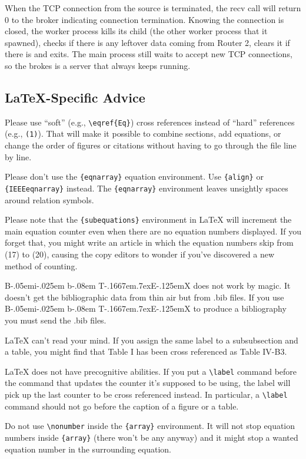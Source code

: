 \documentclass[conference]{IEEEtran}
\def\BibTeX{{\rm B\kern-.05em{\sc i\kern-.025em b}\kern-.08em
    T\kern-.1667em\lower.7ex\hbox{E}\kern-.125emX}}
\begin{document}
When the TCP connection from the source is terminated, the recv call will return 0
to the broker indicating connection termination. Knowing the connection is closed,
the worker process kills its child (the other worker process that it spawned),
checks if there is any leftover data coming from Router 2, clears it if there is
and exits. The main process still waits to accept new TCP connections, so the brokes
is a server that always keeps running.

\subsection{\LaTeX-Specific Advice}

Please use ``soft'' (e.g., \verb|\eqref{Eq}|) cross references instead
of ``hard'' references (e.g., \verb|(1)|). That will make it possible
to combine sections, add equations, or change the order of figures or
citations without having to go through the file line by line.

Please don't use the \verb|{eqnarray}| equation environment. Use
\verb|{align}| or \verb|{IEEEeqnarray}| instead. The \verb|{eqnarray}|
environment leaves unsightly spaces around relation symbols.

Please note that the \verb|{subequations}| environment in {\LaTeX}
will increment the main equation counter even when there are no
equation numbers displayed. If you forget that, you might write an
article in which the equation numbers skip from (17) to (20), causing
the copy editors to wonder if you've discovered a new method of
counting.

{\BibTeX} does not work by magic. It doesn't get the bibliographic
data from thin air but from .bib files. If you use {\BibTeX} to produce a
bibliography you must send the .bib files. 

{\LaTeX} can't read your mind. If you assign the same label to a
subsubsection and a table, you might find that Table I has been cross
referenced as Table IV-B3. 

{\LaTeX} does not have precognitive abilities. If you put a
\verb|\label| command before the command that updates the counter it's
supposed to be using, the label will pick up the last counter to be
cross referenced instead. In particular, a \verb|\label| command
should not go before the caption of a figure or a table.

Do not use \verb|\nonumber| inside the \verb|{array}| environment. It
will not stop equation numbers inside \verb|{array}| (there won't be
any anyway) and it might stop a wanted equation number in the
surrounding equation.
\end{document}
